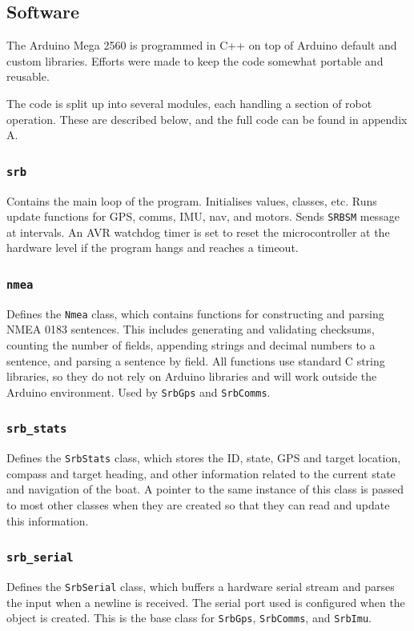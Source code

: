 \documentclass[a4paper]{IEEEtran}
\begin{document}
\subsection{Software}
The Arduino Mega 2560 is programmed in C++ on top of Arduino default and custom libraries. Efforts were made to keep the code somewhat portable and reusable.

The code is split up into several modules, each handling a section of robot operation. These are described below, and the full code can be found in appendix A.

\subsubsection{\texttt{srb}}
Contains the main loop of the program. Initialises values, classes, etc. Runs update functions for GPS, comms, IMU, nav, and motors. Sends \texttt{SRBSM} message at intervals. An AVR watchdog timer is set to reset the microcontroller at the hardware level if the program hangs and reaches a timeout. 

\subsubsection{\texttt{nmea}}
Defines the \texttt{Nmea} class, which contains functions for constructing and parsing NMEA 0183 sentences. This includes generating and validating checksums, counting the number of fields, appending strings and decimal numbers to a sentence, and parsing a sentence by field. All functions use standard C string libraries, so they do not rely on Arduino libraries and will work outside the Arduino environment. Used by \texttt{SrbGps} and \texttt{SrbComms}.

\subsubsection{\texttt{srb\_stats}}
Defines the \texttt{SrbStats} class, which stores the ID, state, GPS and target location, compass and target heading, and other information related to the current state and navigation of the boat. A pointer to the same instance of this class is passed to most other classes when they are created so that they can read and update this information.

\subsubsection{\texttt{srb\_serial}}
Defines the \texttt{SrbSerial} class, which buffers a hardware serial stream and parses the input when a newline is received. The serial port used is configured when the object is created. This is the base class for \texttt{SrbGps}, \texttt{SrbComms}, and \texttt{SrbImu}.
\end{document}
